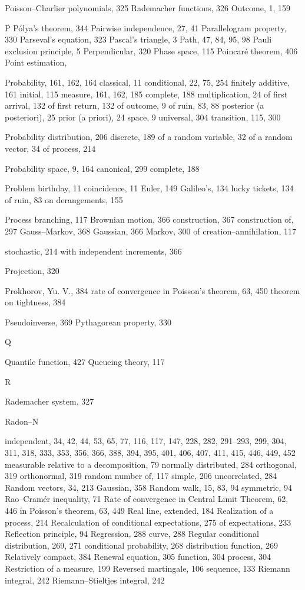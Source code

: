 Poisson–Charlier polynomials, 325
Rademacher functions, 326
Outcome, 1, 159

P
Pólya’s theorem, 344
Pairwise independence, 27, 41
Parallelogram property, 330
Parseval’s equation, 323
Pascal’s triangle, 3
Path, 47, 84, 95, 98
Pauli exclusion principle, 5
Perpendicular, 320
Phase space, 115
Poincaré theorem, 406
Point estimation,

Probability, 161, 162, 164
classical, 11
conditional, 22, 75, 254
finitely additive, 161
initial, 115
measure, 161, 162, 185
complete, 188
multiplication, 24
of first arrival, 132
of first return, 132
of outcome, 9
of ruin, 83, 88
posterior (a posteriori), 25
prior (a priori), 24
space, 9
universal, 304
transition, 115, 300

Probability distribution, 206
discrete, 189
of a random variable, 32
of a random vector, 34
of process, 214

Probability space, 9, 164
canonical, 299
complete, 188

Problem
birthday, 11
coincidence, 11
Euler, 149
Galileo’s, 134
lucky tickets, 134
of ruin, 83
on derangements, 155

Process
branching, 117
Brownian motion, 366
construction, 367
construction of, 297
Gauss–Markov, 368
Gaussian, 366
Markov, 300
of creation–annihilation, 117

stochastic, 214
with independent increments, 366

Projection, 320

Prokhorov, Yu. V., 384
rate of convergence in Poisson’s
theorem, 63, 450
theorem on tightness, 384

Pseudoinverse, 369
Pythagorean property, 330

Q

Quantile function, 427
Queueing theory, 117

R

Rademacher system, 327

Radon–N

independent, 34, 42, 44, 53, 65, 77, 116, 117, 147, 228, 282, 291–293, 299, 304, 311, 318, 333, 353, 356, 366, 388, 394, 395, 401, 406, 407, 411, 415, 446, 449, 452
measurable relative to a decomposition, 79
normally distributed, 284
orthogonal, 319
orthonormal, 319
random number of, 117
simple, 206
uncorrelated, 284
Random vectors, 34, 213
Gaussian, 358
Random walk, 15, 83, 94
symmetric, 94
Rao–Cramér inequality, 71
Rate of convergence in Central Limit Theorem, 62, 446
in Poisson’s theorem, 63, 449
Real line, extended, 184
Realization of a process, 214
Recalculation of conditional expectations, 275
of expectations, 233
Reflection principle, 94
Regression, 288
curve, 288
Regular conditional distribution, 269, 271
conditional probability, 268
distribution function, 269
Relatively compact, 384
Renewal equation, 305
function, 304
process, 304
Restriction of a measure, 199
Reversed martingale, 106
sequence, 133
Riemann integral, 242
Riemann–Stieltjes integral, 242

